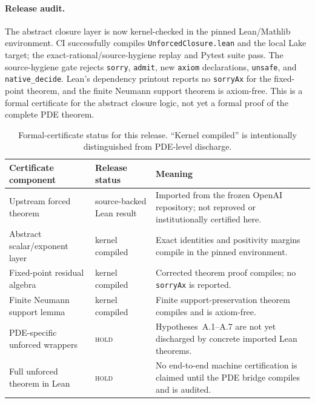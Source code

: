 \documentclass[11pt]{article}
\numberwithin{equation}{section}
\newcommand{\statushold}{\textsc{hold}}
\begin{document}
\paragraph{Release audit.}
The abstract closure layer is now kernel-checked in the pinned Lean/Mathlib environment.  CI successfully compiles \texttt{UnforcedClosure.lean} and the local Lake target; the exact-rational/source-hygiene replay and Pytest suite pass.  The source-hygiene gate rejects \texttt{sorry}, \texttt{admit}, new \texttt{axiom} declarations, \texttt{unsafe}, and \texttt{native\_decide}.  Lean's dependency printout reports no \texttt{sorryAx} for the fixed-point theorem, and the finite Neumann support theorem is axiom-free.  This is a formal certificate for the abstract closure logic, not yet a formal proof of the complete PDE theorem.

\begin{table}[h]
\centering
\small
\begin{tabularx}{\textwidth}{@{}p{}p{}X@{}}
\toprule
Certificate component & Release status & Meaning \\
\midrule
Upstream forced theorem & source-backed Lean result & Imported from the frozen OpenAI repository; not reproved or institutionally certified here. \\
Abstract scalar/exponent layer & kernel compiled & Exact identities and positivity margins compile in the pinned environment. \\
Fixed-point residual algebra & kernel compiled & Corrected theorem proof compiles; no \texttt{sorryAx} is reported. \\
Finite Neumann support lemma & kernel compiled & Finite support-preservation theorem compiles and is axiom-free. \\
PDE-specific unforced wrappers & \statushold & Hypotheses~A.1--A.7 are not yet discharged by concrete imported Lean theorems. \\
Full unforced theorem in Lean & \statushold & No end-to-end machine certification is claimed until the PDE bridge compiles and is audited. \\
\bottomrule
\end{tabularx}
\caption{Formal-certificate status for this release.  ``Kernel compiled'' is intentionally distinguished from PDE-level discharge.}
\label{tab:leanstatus}
\end{table}
\end{document}
